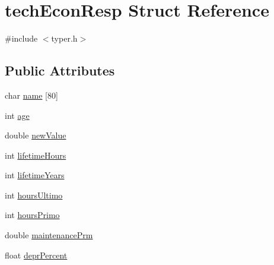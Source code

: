 \hypertarget{structtech_econ_resp}{
\section{techEconResp Struct Reference}
\label{structtech_econ_resp}
}


{\ttfamily \#include $<$typer.h$>$}\subsection*{Public Attributes}
\begin{DoxyCompactItemize}
\item 
char \hyperlink{structtech_econ_resp_abfd988095eab24fd2fa75ef2a7648587}{name} \mbox{[}80\mbox{]}
\item 
int \hyperlink{structtech_econ_resp_a74f93b4f5d2bf3eb92da5847060f6ca4}{age}
\item 
double \hyperlink{structtech_econ_resp_abe2a6b9862cba8a5e347dd0b99d87a4c}{newValue}
\item 
int \hyperlink{structtech_econ_resp_a54103fb74eb1e2cc2371121e593bbda8}{lifetimeHours}
\item 
int \hyperlink{structtech_econ_resp_a4d8720d8e1a825f4b5e92082051e85b8}{lifetimeYears}
\item 
int \hyperlink{structtech_econ_resp_a92d29889410e20e9c574f4fc6edf736a}{hoursUltimo}
\item 
int \hyperlink{structtech_econ_resp_aed5ec073c7496e778b6feefdaa5210b7}{hoursPrimo}
\item 
double \hyperlink{structtech_econ_resp_ad6b77834e1e25113103f3846750dd397}{maintenancePrm}
\item 
float \hyperlink{structtech_econ_resp_a3e0a92b4a702467a889a80920a7836af}{deprPercent}
\end{DoxyCompactItemize}



